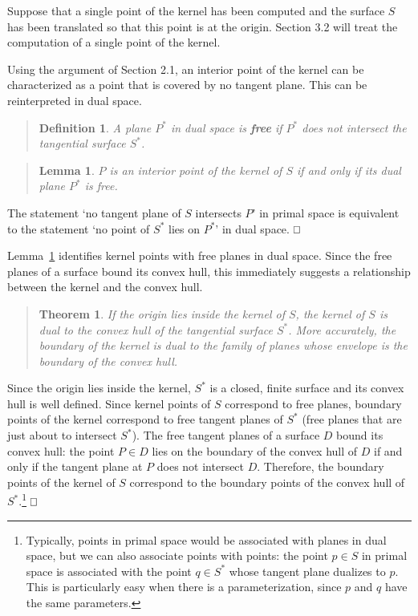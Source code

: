 \documentclass[twoside]{article}
\newtheorem{definitionenv}{Definition}
\newenvironment{defn2}{\begin{quote}\begin{definitionenv}}%
                           {\end{definitionenv}\end{quote}}
\newtheorem{theoremenv}{Theorem}
\newenvironment{theorem}{\begin{quote}\begin{theoremenv}}%
                           {\end{theoremenv}\end{quote}}
\newtheorem{lemmaenv}{Lemma}
\newenvironment{lemma}{\begin{quote}\begin{lemmaenv}}%
                           {\end{lemmaenv}\end{quote}}
\newcommand{\prf}{\noindent{{\bf Proof}:\ \ \ }}
\def\qed{\hbox{${\vcenter{\vbox{			%
   \hrule height 0.4pt\hbox{\vrule width 0.4pt height 6pt
   \kern5pt\vrule width 0.4pt}\hrule height 0.4pt}}}$}}
\begin{document}
Suppose that a single point of the kernel has been computed and the surface $S$
has been translated so that this point is at the origin.
Section 3.2 will treat the computation of a single point of the kernel.

Using the argument of Section 2.1,
an interior point of the kernel can be characterized as a point that is covered by
no tangent plane.
This can be reinterpreted in dual space.

\begin{defn2}
A plane $P^*$ in dual space is {\bf free} if $P^*$ does not intersect the tangential surface $S^*$.
\end{defn2}

\begin{lemma}
\label{lem:dualkernelchar}
$P$ is an interior point of the kernel of $S$ if and only if 
its dual plane $P^*$ is free.
\end{lemma}
\prf
The statement `no tangent plane of $S$ intersects $P$' in primal space
is equivalent to the statement `no point of $S^*$ lies on $P^*$' in dual space.
\qed\,

\smallskip

Lemma~\ref{lem:dualkernelchar} identifies kernel points
with free planes in dual space.
Since the free planes of a surface bound its convex hull,
this immediately suggests a relationship between the kernel and the convex hull.

\begin{theorem}
\label{thm:kernelhull}
If the origin lies inside the kernel of $S$,
the kernel of $S$ is dual to the convex hull of the tangential surface $S^*$.
More accurately, the boundary of the kernel is dual to the family of planes whose
envelope is the boundary of the convex hull.
\end{theorem}
\prf
Since the origin lies inside the kernel, $S^*$ is a closed, finite surface
and its convex hull is well defined.
Since kernel points of $S$ correspond to free planes,
boundary points of the kernel correspond to free tangent planes of $S^*$
(free planes that are just about to intersect $S^*$).
The free tangent planes of a surface $D$ bound its convex hull: the point $P \in D$ lies
on the boundary of the convex hull of $D$ if and only if the tangent plane at $P$ 
does not intersect $D$.
Therefore, the boundary points of the kernel of $S$ correspond to the boundary points
of the convex hull of $S^*$.\footnote{Typically, points in primal space would be associated with planes in dual space,
	but we can also associate points with points:
	the point $p \in S$ in primal space is associated
	with the point $q \in S^*$ whose tangent plane dualizes to $p$.
	This is particularly easy when there is a parameterization, since $p$ and $q$ 
	have the same parameters.}
\qed\,
\end{document}
